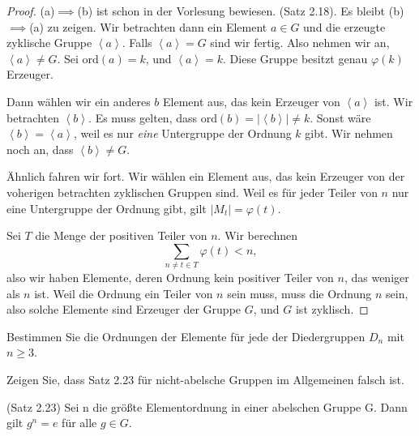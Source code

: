 \begin{proof}
	(a)$\implies$(b) ist schon in der Vorlesung bewiesen. (Satz 2.18). Es bleibt (b)$\implies$(a) zu zeigen. Wir betrachten dann ein Element $a\in G$ und die erzeugte zyklische Gruppe $\left<a \right>$. Falls $\left<a \right> = G$ sind wir fertig. Also nehmen wir an, $\left<a \right>\neq G$. Sei $\text{ord}(a)=k$, und $\left<a \right> = k$. Diese Gruppe besitzt genau $\varphi(k)$ Erzeuger.
	
	Dann wählen wir ein anderes $b$ Element aus, das kein Erzeuger von $\left<a \right>$ ist. Wir betrachten $\left<b \right>$. Es muss gelten, dass $\text{ord}(b)=\left| \left<b \right> \right| \neq k$. Sonst wäre $\left<b \right> = \left<a \right>$, weil es nur \emph{eine} Untergruppe der Ordnung $k$ gibt. Wir nehmen noch an, dass $\left<b \right>\neq G$.

	Ähnlich fahren wir fort. Wir wählen ein Element aus, das kein Erzeuger von der voherigen betrachten zyklischen Gruppen sind. Weil es f\"{u}r jeder Teiler von $n$ nur eine Untergruppe der Ordnung gibt, gilt $|M_t|=\varphi(t)$.

	Sei $T$ die Menge der positiven Teiler von $n$. Wir berechnen
	\[
	\sum_{n\neq t\in T}\varphi(t)<n
	,\] 
	also wir haben Elemente, deren Ordnung kein positiver Teiler von $n$, das weniger als $n$ ist. Weil die Ordnung ein Teiler von $n$ sein muss, muss die Ordnung $n$ sein, also solche Elemente sind Erzeuger der Gruppe $G$, und $G$ ist zyklisch.
\end{proof}
\begin{Problem}
	\begin{parts}
	\item  Bestimmen Sie die Ordnungen der Elemente für jede der Diedergruppen $D_n$ mit $n\ge 3$.
	\item  Zeigen Sie, dass Satz 2.23 für nicht-abelsche Gruppen im Allgemeinen falsch ist.
		\begin{tcolorbox}
			(Satz 2.23) Sei n die größte Elementordnung in einer abelschen Gruppe G. Dann gilt $g^n = e$ für alle $g \in G$.
		\end{tcolorbox}
	\end{parts}
\end{Problem}
